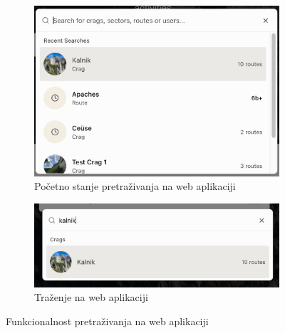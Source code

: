\begin{figure}[H]
\begin{subfigure}[b]{0.48\textwidth}
\includegraphics[width=\textwidth]{images/implementacija/web/search_default.png}
        \caption{Početno stanje pretraživanja na web aplikaciji}
        \label{fig:pretrazivanje_web_1}
    \end{subfigure}
    \hfill
    \begin{subfigure}[b]{0.48\textwidth}
        \centering
        \includegraphics[width=\textwidth]{images/implementacija/web/search_searching.png}
        \caption{Traženje na web aplikaciji}
        \label{fig:pretrazivanje_web_2}
    \end{subfigure}
    \caption{Funkcionalnost pretraživanja na web aplikaciji}
    \label{fig:pretrazivanje_side_by_side}
\end{figure}